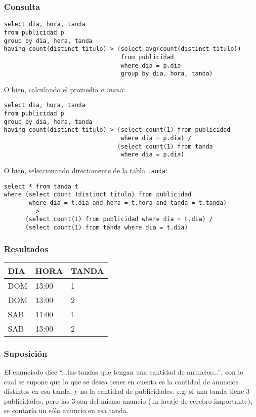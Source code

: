 \subsubsection*{Consulta}
\begin{lstlisting} 
select dia, hora, tanda
from publicidad p
group by dia, hora, tanda
having count(distinct titulo) > (select avg(count(distinct titulo))
                                 from publicidad
                                 where dia = p.dia
                                 group by dia, hora, tanda)
\end{lstlisting}

O bien, calculando el promedio \textit{a mano}:
\begin{lstlisting}
select dia, hora, tanda
from publicidad p
group by dia, hora, tanda
having count(distinct titulo) > (select count(1) from publicidad 
                                 where dia = p.dia) /
                                (select count(1) from tanda
                                 where dia = p.dia)
\end{lstlisting}

O bien, seleccionando directamente de la tabla \lstinline|tanda|:
\begin{lstlisting}
select * from tanda t
where (select count (distinct titulo) from publicidad 
       where dia = t.dia and hora = t.hora and tanda = t.tanda) 
         > 
      (select count(1) from publicidad where dia = t.dia) /
      (select count(1) from tanda where dia = t.dia)
\end{lstlisting}

\subsubsection*{Resultados}
\begin{tabular}{|l|l|l|}
  \hline
    \bf{DIA} & \bf{HORA} & \bf{TANDA} \\ 
  \hline
    DOM & 13:00 & 1 \\
    DOM & 13:00 & 2 \\
    SAB & 11:00 & 1 \\
    SAB & 13:00 & 2 \\
  \hline
\end{tabular} 

\subsubsection*{Suposici\'on}
El enunciado dice ``...las tandas que tengan una cantidad de anuncios...'', con lo cual se supone que lo que se desea tener en cuenta es la cantidad de anuncios distintos en esa tanda, y no la cantidad de publicidades. e.g: si una tanda tiene 3 publicidades, pero las 3 son del mismo anuncio (un lavaje de cerebro importante), se contaría un sólo anuncio en esa tanda. \\


